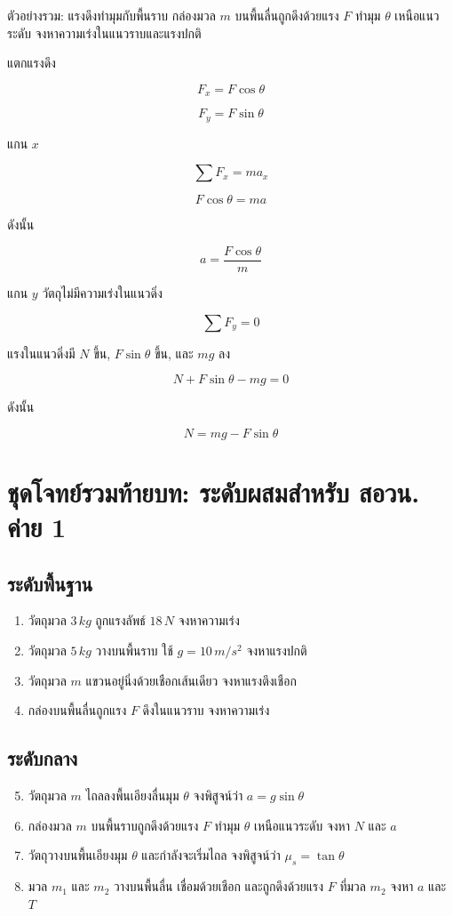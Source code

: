 \begin{examplebox}{ตัวอย่างรวม: แรงดึงทำมุมกับพื้นราบ}
กล่องมวล $m$ บนพื้นลื่นถูกดึงด้วยแรง $F$ ทำมุม $\theta$ เหนือแนวระดับ จงหาความเร่งในแนวราบและแรงปกติ

แตกแรงดึง

\[
F_x=F\cos\theta
\]

\[
F_y=F\sin\theta
\]

แกน $x$

\[
\sum F_x=ma_x
\]

\[
F\cos\theta=ma
\]

ดังนั้น

\[
\boxed{a=\frac{F\cos\theta}{m}}
\]

แกน $y$ วัตถุไม่มีความเร่งในแนวดิ่ง

\[
\sum F_y=0
\]

แรงในแนวดิ่งมี $N$ ขึ้น, $F\sin\theta$ ขึ้น, และ $mg$ ลง

\[
N+F\sin\theta-mg=0
\]

ดังนั้น

\[
\boxed{N=mg-F\sin\theta}
\]
\end{examplebox}

\section{ชุดโจทย์รวมท้ายบท: ระดับผสมสำหรับ สอวน. ค่าย 1}

\subsection*{ระดับพื้นฐาน}

\begin{enumerate}
    \item วัตถุมวล $3\,\si{kg}$ ถูกแรงลัพธ์ $18\,\si{N}$ จงหาความเร่ง
    \item วัตถุมวล $5\,\si{kg}$ วางบนพื้นราบ ใช้ $g=10\,\si{m/s^2}$ จงหาแรงปกติ
    \item วัตถุมวล $m$ แขวนอยู่นิ่งด้วยเชือกเส้นเดียว จงหาแรงตึงเชือก
    \item กล่องบนพื้นลื่นถูกแรง $F$ ดึงในแนวราบ จงหาความเร่ง
\end{enumerate}

\subsection*{ระดับกลาง}

\begin{enumerate}
    \setcounter{enumi}{4}
    \item วัตถุมวล $m$ ไถลลงพื้นเอียงลื่นมุม $\theta$ จงพิสูจน์ว่า $a=g\sin\theta$
    \item กล่องมวล $m$ บนพื้นราบถูกดึงด้วยแรง $F$ ทำมุม $\theta$ เหนือแนวระดับ จงหา $N$ และ $a$
    \item วัตถุวางบนพื้นเอียงมุม $\theta$ และกำลังจะเริ่มไถล จงพิสูจน์ว่า $\mu_s=\tan\theta$
    \item มวล $m_1$ และ $m_2$ วางบนพื้นลื่น เชื่อมด้วยเชือก และถูกดึงด้วยแรง $F$ ที่มวล $m_2$ จงหา $a$ และ $T$
\end{enumerate}


